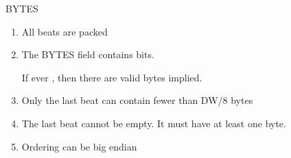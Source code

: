 \documentclass[style=gt,mode=present,paper=screen]{powerdot}
\begin{document}
\begin{slide}[method=file]{BYTES}
\begin{enumerate}
\item All beats are packed
\item The BYTES field contains  bits.

	If ever , then there are
	 valid bytes implied.

\item Only the last beat can contain fewer than DW/8 bytes
\item The last beat cannot be empty.  It must have at least one byte.
\item Ordering can be big  endian
\end{enumerate}

\begin{center}
%
\end{center}
\end{slide}
%
%
%
%
\end{document}
